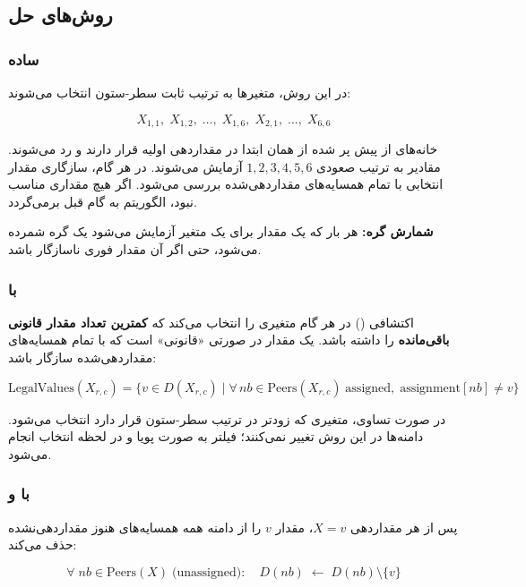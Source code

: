 \documentclass[10.5pt]{exam}
\begin{document}
\subsection*{روش‌های حل}


\subsubsection*{ ساده}

در این روش، متغیرها به ترتیب ثابت سطر-ستون انتخاب می‌شوند:

\[
  X_{1,1},\; X_{1,2},\; \ldots,\; X_{1,6},\; X_{2,1},\; \ldots,\; X_{6,6}
\]

خانه‌های از پیش پر شده از همان ابتدا در مقداردهی اولیه قرار دارند و رد می‌شوند.
مقادیر به ترتیب صعودی $1, 2, 3, 4, 5, 6$ آزمایش می‌شوند.
در هر گام، سازگاری مقدار انتخابی با تمام همسایه‌های مقداردهی‌شده بررسی می‌شود.
اگر هیچ مقداری مناسب نبود، الگوریتم به گام قبل برمی‌گردد.

\textbf{شمارش گره:}
هر بار که یک مقدار برای یک متغیر آزمایش می‌شود یک گره شمرده می‌شود،
حتی اگر آن مقدار فوری ناسازگار باشد.

\subsubsection*{ با }

اکتشافی
()
در هر گام متغیری را انتخاب می‌کند که \textbf{کمترین تعداد مقدار قانونی باقی‌مانده} را داشته باشد.
یک مقدار در صورتی «قانونی» است که با تمام همسایه‌های مقداردهی‌شده سازگار باشد:

\[
  \text{LegalValues}(X_{r,c}) = \{v \in D(X_{r,c}) \mid \forall\, nb \in \text{Peers}(X_{r,c})\; \text{assigned},\; \text{assignment}[nb] \neq v\}
\]

در صورت تساوی، متغیری که زودتر در ترتیب سطر-ستون قرار دارد انتخاب می‌شود.
دامنه‌ها در این روش تغییر نمی‌کنند؛ فیلتر به صورت پویا و در لحظه انتخاب انجام می‌شود.

\subsubsection*{ با  و }

پس از هر مقداردهی $X = v$، مقدار $v$ را از دامنه همه همسایه‌های هنوز مقداردهی‌نشده حذف می‌کند:

\[
  \forall\; nb \in \text{Peers}(X)\; \text{(unassigned)}:\quad D(nb) \;\leftarrow\; D(nb) \setminus \{v\}
\]
\end{document}
